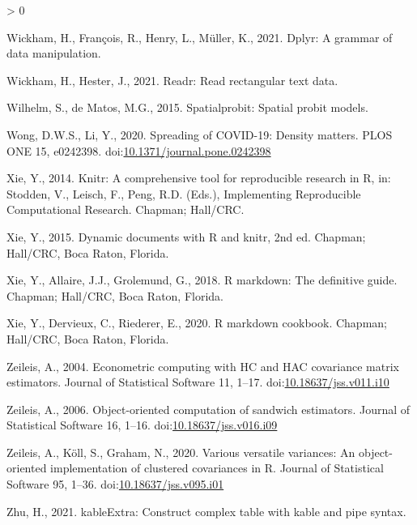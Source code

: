 \documentclass[]{elsarticle} %
\newlength{\cslhangindent}
\newenvironment{CSLReferences}[2] %
 {%
  \setlength{\parindent}{0pt}
  \ifodd #1 \everypar{\setlength{\hangindent}{\cslhangindent}}\ignorespaces\fi
  \ifnum #2 > 0
  \setlength{\parskip}{#2\baselineskip}
  \fi
 }%
 {}
\begin{document}
\begin{CSLReferences}{1}{0}
\leavevmode\hypertarget{ref-R-dplyr}{}%
Wickham, H., François, R., Henry, L., Müller, K., 2021. Dplyr: A grammar
of data manipulation.

\leavevmode\hypertarget{ref-R-readr}{}%
Wickham, H., Hester, J., 2021. Readr: Read rectangular text data.

\leavevmode\hypertarget{ref-R-spatialprobit}{}%
Wilhelm, S., de Matos, M.G., 2015. Spatialprobit: Spatial probit models.

\leavevmode\hypertarget{ref-Wong2020spreading}{}%
Wong, D.W.S., Li, Y., 2020. Spreading of COVID-19: Density matters. PLOS
ONE 15, e0242398.
doi:\href{https://doi.org/10.1371/journal.pone.0242398}{10.1371/journal.pone.0242398}

\leavevmode\hypertarget{ref-knitr2014}{}%
Xie, Y., 2014. Knitr: A comprehensive tool for reproducible research in
{R}, in: Stodden, V., Leisch, F., Peng, R.D. (Eds.), Implementing
Reproducible Computational Research. Chapman; Hall/CRC.

\leavevmode\hypertarget{ref-knitr2015}{}%
Xie, Y., 2015. Dynamic documents with {R} and knitr, 2nd ed. Chapman;
Hall/CRC, Boca Raton, Florida.

\leavevmode\hypertarget{ref-rmarkdown2018}{}%
Xie, Y., Allaire, J.J., Grolemund, G., 2018. R markdown: The definitive
guide. Chapman; Hall/CRC, Boca Raton, Florida.

\leavevmode\hypertarget{ref-rmarkdown2020}{}%
Xie, Y., Dervieux, C., Riederer, E., 2020. R markdown cookbook. Chapman;
Hall/CRC, Boca Raton, Florida.

\leavevmode\hypertarget{ref-sandwich2004}{}%
Zeileis, A., 2004. Econometric computing with {HC} and {HAC} covariance
matrix estimators. Journal of Statistical Software 11, 1--17.
doi:\href{https://doi.org/10.18637/jss.v011.i10}{10.18637/jss.v011.i10}

\leavevmode\hypertarget{ref-sandwich2006}{}%
Zeileis, A., 2006. Object-oriented computation of sandwich estimators.
Journal of Statistical Software 16, 1--16.
doi:\href{https://doi.org/10.18637/jss.v016.i09}{10.18637/jss.v016.i09}

\leavevmode\hypertarget{ref-sandwich2020}{}%
Zeileis, A., Köll, S., Graham, N., 2020. Various versatile variances: An
object-oriented implementation of clustered covariances in {R}. Journal
of Statistical Software 95, 1--36.
doi:\href{https://doi.org/10.18637/jss.v095.i01}{10.18637/jss.v095.i01}

\leavevmode\hypertarget{ref-R-kableExtra}{}%
Zhu, H., 2021. kableExtra: Construct complex table with kable and pipe
syntax.

\end{CSLReferences}
\end{document}
